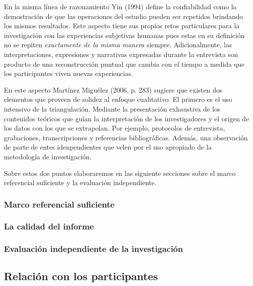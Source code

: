 En la misma línea de razonamiento Yin (1994) define la confiabilidad como la
demostración de que las operaciones del estudio pueden ser repetidos
brindando los mismos resultados.
Este aspecto tiene sus propios retos particulares para la investigación con
las experiencias subjetivas humanas pues estas en su definición no se repiten
\emph{exactamente de la misma manera} siempre.
Adicionalmente, las interpretaciones, expresiones y narrativas expresadas
durante la entrevista son producto de una reconstrucción puntual que cambia
con el tiempo a medida que los participantes viven nuevas experiencias.

En este aspecto Martínez Miguélez (2006, p. 283) sugiere que existen dos
elementos que proveen de solidez al enfoque cualitativo.
El primero es el uso intensivo de la triangulación.
Mediante la presentación exhaustiva de los contenidos teóricos que guían la
interpretación de los investigadores y el origen de los datos con los que se
extrapolan.
Por ejemplo, protocolos de entrevista, grabaciones, transcripciones y
referencias bibliográficas.
Además, una observación de parte de entes idenpendientes que velen por el uso
apropiado de la metodología de investigación.

Sobre estos dos puntos elaboraremos en las siguiente secciones sobre el marco
referencial suficiente y la evaluación independiente.

    \subsubsection{Marco referencial suficiente}

    \subsubsection{La calidad del informe}

    \subsubsection{Evaluación independiente de la investigación}

\subsection{Relación con los participantes}
